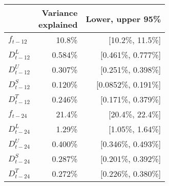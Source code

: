 \begin{tabular}{l r r }
  \toprule
  ~ & \specialcell{Variance \\ explained} & Lower, upper 95\% \\
  \midrule
$f_{t-12}$ & 10.8\% & [10.2\%, 11.5\%]  \\ 
$D^{L}_{t-12}$ & 0.584\% & [0.461\%, 0.777\%]  \\ 
$D^{U}_{t-12}$ & 0.307\% & [0.251\%, 0.398\%] \\ 
$D^{S}_{t-12}$ & 0.120\% & [0.0852\%, 0.191\%] \\ 
$D^{T}_{t-12}$ & 0.246\% & [0.171\%, 0.379\%]  \\[2ex]
$f_{t-24}$ & 21.4\% & [20.4\%, 22.4\%] \\ 
$D^{L}_{t-24}$ & 1.29\% & [1.05\%, 1.64\%] \\ 
$D^{U}_{t-24}$ & 0.400\% & [0.346\%, 0.493\%] \\ 
$D^{S}_{t-24}$ & 0.287\%  & [0.201\%, 0.392\%] \\ 
$D^{T}_{t-24}$ & 0.272\% & [0.226\%, 0.380\%] \\ \bottomrule
\end{tabular}
